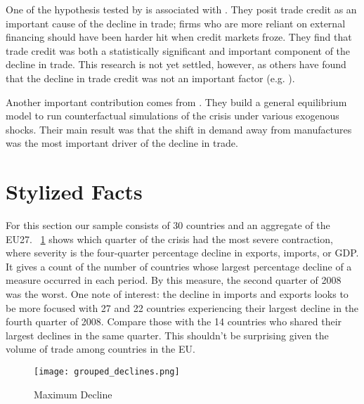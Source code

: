 \documentclass[11pt]{article}
\begin{document}
  One of the hypothesis tested by \cite{llt:2010} is associated with \cite{chor-manova:2012}. They posit trade credit as an important cause of the decline in trade; firms who are more reliant on external financing should have been harder hit when credit markets froze.  They find that trade credit was both a statistically significant and important component of the decline in trade.  This research is not yet settled, however, as others have found that the decline in trade credit was not an important factor (e.g. \cite{RePEc:imf:imfwpa:11/16}).

  Another important contribution comes from \cite{eaton-kortum-neiman-romalis:2011}.  They build a general equilibrium model to run counterfactual simulations of the crisis under various exogenous shocks.  Their main result was that the shift in demand away from manufactures was the most important driver of the decline in trade.

\section{Stylized Facts}
\label{sec:stylized_facts}

  For this section our sample consists of 30 countries and an aggregate of the EU27.  ~\ref{fig:declines} shows which quarter of the crisis had the most severe contraction, where severity is the four-quarter percentage decline in exports, imports, or GDP.  It gives a count of the number of countries whose largest percentage decline of a measure occurred in each period.  By this measure, the second quarter of 2008 was the worst.  One note of interest: the decline in imports and exports looks to be more focused with 27 and 22 countries experiencing their largest decline in the fourth quarter of 2008.  Compare those with the 14 countries who shared their largest declines in the same quarter.  This shouldn't be surprising given the volume of trade among countries in the EU.

  \begin{figure}[ht] \label{fig:declines}
    \centering
      \texttt{[image: grouped\_declines.png]}
    \caption{Maximum Decline}
  \end{figure}
\end{document}
